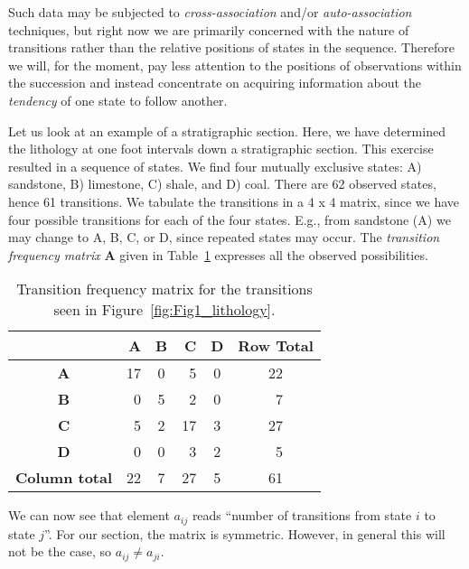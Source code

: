      Such data may be subjected to \emph{cross-association} and/or \emph{auto-association} techniques, but right 
now we are primarily concerned with the nature of transitions rather than the relative positions of 
states in the sequence.  Therefore we will, for the moment, pay less attention to the positions of observations 
within the succession and instead concentrate on acquiring information about the \emph{tendency} 
of one state to follow another.
\begin{example}

     Let us look at an example of a stratigraphic section.  Here, we have determined the lithology 
at one foot intervals down a stratigraphic section.  This exercise resulted in a sequence of states.
	We find four mutually exclusive states: A) sandstone, B) limestone, C) shale, and 
D) coal.  There are 62 observed states, hence 61 transitions.  We tabulate the transitions in a 
4 x 4 matrix, since we have four possible transitions for each of the four states.  E.g., from sandstone 
(A) we may change to A, B, C, or D, since repeated states may occur.  The \emph{transition frequency 
matrix} $\mathbf{A}$ given in Table~\ref{tbl:markov1} expresses all the observed possibilities.
\begin{table}[h]
\center
\begin{tabular}{|c|r|c|r|c|c|}
\hline
 & \bf{A} & \bf{B} & \bf{C} & \bf{D} & \bf{Row Total}\\ \hline
\bf{A} & 17 & 0 & 5 & 0 & 22 \\ \hline
\bf{B} & 0 & 5 & 2 & 0 & \, 7 \\ \hline
\bf{C} & 5 & 2 & 17 & 3 & 27 \\ \hline
\bf{D} & 0 & 0 & 3 & 2 & \, 5 \\ \hline
\bf{Column total} & 22 & 7 & 27 & 5 & 61 \\ \hline
\end{tabular} 
\caption{Transition frequency matrix for the transitions seen in Figure~\ref{fig:Fig1_lithology}.}
\label{tbl:markov1}
\end{table}
We can now see that element $a_{ij}$ reads ``number of transitions from state $i$ to state $j$''.
For our section, the matrix is symmetric.  However, in general this will not be the case, so $a_{ij} \neq   a_{ji}$.


\end{example}
